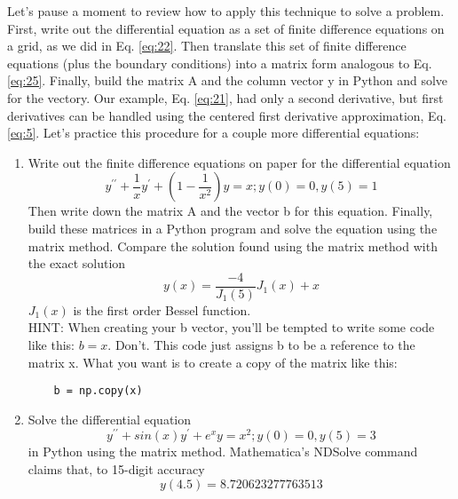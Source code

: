 Let\rq s pause a moment to review how to apply this technique to solve a problem. First, write out the differential equation as a set of finite difference equations on a grid, as we did in Eq. \eqref{eq:22}. Then translate this set of finite difference equations (plus the boundary conditions) into a matrix form analogous to Eq. \eqref{eq:25}. Finally, build the matrix A and the column vector y in Python and solve for the vectory. Our example, Eq. \eqref{eq:21}, had only a second derivative, but first derivatives can be handled using the centered first derivative approximation, Eq. \eqref{eq:5}. Let\rq s practice this procedure for a couple more differential equations:
\begin{problem} \label{P2.3}
	\begin{enumerate}[label=(\alph*)]
		\item Write out the finite difference equations on paper for the differential equation
		\begin{equation} \label{eq:26}
				y^{\prime\prime} + \frac{1}{x}y^\prime + (1 - \frac{1}{x^2})y=x ; y(0) = 0 , y(5) = 1
		\end{equation}
		Then write down the matrix A and the vector b for this equation. Finally, build these matrices in a Python program and solve the equation using the matrix method. Compare the solution found using the matrix method with the exact solution
		\begin{equation*}
			y(x) = \frac{-4}{J_1(5)}J_1(x)+x
		\end{equation*}
		$J_1(x)$ is the first order Bessel function.\\ HINT: When creating your b vector, you\rq ll be tempted to write some code like this: $b=x$. Don\rq t. This code just assigns b to be a reference to the matrix x. What you want is to create a copy of the matrix like this: \\ 
		\begin{lstlisting}	
	b = np.copy(x)
	\end{lstlisting}
	\item 	Solve the differential equation
	\begin{equation}\label{eq:27}
	y^{\prime\prime} + sin(x)y^\prime+e^xy=x^2 ; y(0) = 0, y(5)=3
\end{equation}		
	in Python using the matrix method. Mathematica\rq s NDSolve command claims that, to 15-digit accuracy
		\begin{equation*}
			y(4.5) = 8.720623277763513
		\end{equation*}


\end{enumerate}
\end{problem}
